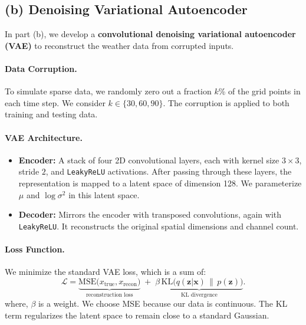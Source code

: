 \documentclass{article}
\begin{document}
\subsection*{(b) Denoising Variational Autoencoder}

In part (b), we develop a \textbf{convolutional denoising variational autoencoder (VAE)} to reconstruct the weather data from corrupted inputs.

\paragraph{Data Corruption.}
To simulate sparse data, we randomly zero out a fraction \(k\)\% of the grid points in each time step. We consider \(k \in \{30, 60, 90\}\). The corruption is applied to both training and testing data.

\paragraph{VAE Architecture.}
\begin{itemize}
    \item \textbf{Encoder:} A stack of four 2D convolutional layers, each with kernel size \(3 \times 3\), stride \(2\), and \texttt{LeakyReLU} activations. After passing through these layers, the representation is mapped to a latent space of dimension 128. We parameterize \(\mu\) and \(\log\sigma^2\) in this latent space.
    \item \textbf{Decoder:} Mirrors the encoder with transposed convolutions, again with \texttt{LeakyReLU}. It reconstructs the original spatial dimensions and channel count. 
\end{itemize}

\paragraph{Loss Function.}
We minimize the standard VAE loss, which is a sum of:
\[
\mathcal{L} = \underbrace{\mathrm{MSE}\bigl(x_{\text{true}}, x_{\text{recon}}\bigr)}_{\text{reconstruction loss}}
\;+\;\underbrace{\beta \,\mathrm{KL}\bigl(q(\mathbf{z}|\mathbf{x}) \,\|\, p(\mathbf{z})\bigr)}_{\text{KL divergence}}.
\]
where, \(\beta\) is a weight. We choose MSE because our data is continuous. The KL term regularizes the latent space to remain close to a standard Gaussian.
\end{document}
